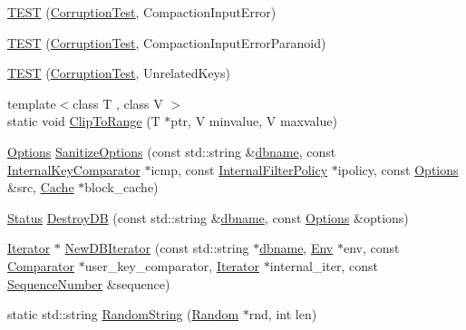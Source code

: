 \begin{DoxyCompactItemize}
\item 
\hyperlink{namespaceleveldb_ac45d45675cfba0614b5788177b03e717}{T\+E\+S\+T} (\hyperlink{classleveldb_1_1_corruption_test}{Corruption\+Test}, Compaction\+Input\+Error)
\item 
\hyperlink{namespaceleveldb_a2bb2a098a32d42044e6be132020b29b0}{T\+E\+S\+T} (\hyperlink{classleveldb_1_1_corruption_test}{Corruption\+Test}, Compaction\+Input\+Error\+Paranoid)
\item 
\hyperlink{namespaceleveldb_adbafd76c895bbb400c6aa4ad6e0eae2e}{T\+E\+S\+T} (\hyperlink{classleveldb_1_1_corruption_test}{Corruption\+Test}, Unrelated\+Keys)
\item 
{\footnotesize template$<$class T , class V $>$ }\\static void \hyperlink{namespaceleveldb_aa571d50e762e410ba1558c7972800caa}{Clip\+To\+Range} (T $\ast$ptr, V minvalue, V maxvalue)
\item 
\hyperlink{structleveldb_1_1_options}{Options} \hyperlink{namespaceleveldb_a526eddaf91e7f89eb8696a4d4b8a2d96}{Sanitize\+Options} (const std\+::string \&\hyperlink{c__test_8c_a75d845559336df6843f3b599960f89d2}{dbname}, const \hyperlink{classleveldb_1_1_internal_key_comparator}{Internal\+Key\+Comparator} $\ast$icmp, const \hyperlink{classleveldb_1_1_internal_filter_policy}{Internal\+Filter\+Policy} $\ast$ipolicy, const \hyperlink{structleveldb_1_1_options}{Options} \&src, \hyperlink{classleveldb_1_1_cache}{Cache} $\ast$block\+\_\+cache)
\item 
\hyperlink{classleveldb_1_1_status}{Status} \hyperlink{namespaceleveldb_a5b0819d4d4adc2147b5e91a5553fd7dc}{Destroy\+D\+B} (const std\+::string \&\hyperlink{c__test_8c_a75d845559336df6843f3b599960f89d2}{dbname}, const \hyperlink{structleveldb_1_1_options}{Options} \&options)
\item 
\hyperlink{classleveldb_1_1_iterator}{Iterator} $\ast$ \hyperlink{namespaceleveldb_a3727bbf2ccdd2e45f16b42d289b52e03}{New\+D\+B\+Iterator} (const std\+::string $\ast$\hyperlink{c__test_8c_a75d845559336df6843f3b599960f89d2}{dbname}, \hyperlink{classleveldb_1_1_env}{Env} $\ast$env, const \hyperlink{structleveldb_1_1_comparator}{Comparator} $\ast$user\+\_\+key\+\_\+comparator, \hyperlink{classleveldb_1_1_iterator}{Iterator} $\ast$internal\+\_\+iter, const \hyperlink{namespaceleveldb_a5481ededd221c36d652c371249f869fa}{Sequence\+Number} \&sequence)
\item 
static std\+::string \hyperlink{namespaceleveldb_ab30792c0730ee094943e8242577454af}{Random\+String} (\hyperlink{classleveldb_1_1_random}{Random} $\ast$rnd, int len)

\end{DoxyCompactItemize}
